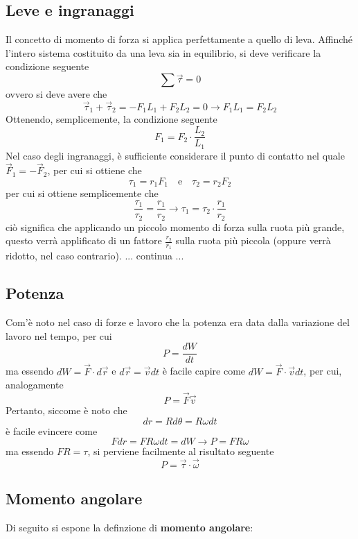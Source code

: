 \documentclass[a4paper]{extarticle}
\begin{document}
\subsection{Leve e ingranaggi}
Il concetto di momento di forza si applica perfettamente a quello di leva. Affinché l'intero sistema costituito da una leva sia in equilibrio, si deve verificare la condizione seguente
\[\sum \vec \tau = 0\]
ovvero si deve avere che
\[\vec \tau_1 + \vec \tau_2 = -F_1 L_1 + F_2 L_2 = 0 \longrightarrow F_1 L_1 = F_2 L_2\]
Ottenendo, semplicemente, la condizione seguente
\[\boxed{F_1=F_2 \cdot \frac{L_2}{L_1}}\]
Nel caso degli ingranaggi, è sufficiente considerare il punto di contatto nel quale $\vec F_1 = - \vec F_2$, per cui si ottiene che
\[\tau_1 = r_1 F_1 \hspace{1em} \text{e} \hspace{1em} \tau_2 = r_2 F_2\]
per cui si ottiene semplicemente che
\[\boxed{\frac{\tau_1}{\tau_2}=\frac{r_1}{r_2} \longrightarrow \tau_1=\tau_2 \cdot \frac{r_1}{r_2}}\]
ciò significa che applicando un piccolo momento di forza sulla ruota più grande, questo verrà applificato di un fattore $\frac{r_2}{r_1}$ sulla ruota più piccola (oppure verrà ridotto, nel caso contrario).
... continua ...

\vspace{1em}
\subsection{Potenza}
Com'è noto nel caso di forze e lavoro che la potenza era data dalla variazione del lavoro nel tempo, per cui
\[\boxed{P=\frac{dW}{dt}}\]
ma essendo $dW=\vec F \cdot d \vec r$ e $d \vec r = \vec v dt$ è facile capire come $dW=\vec F \cdot \vec v dt$, per cui, analogamente
\[\boxed{P=\vec F \vec v}\]
Pertanto, siccome è noto che
\[dr = R d\theta = R \omega dt\]
è facile evincere come
\[F dr = F R \omega dt = dW \longrightarrow P=FR \omega\]
ma essendo $FR=\tau$, si perviene facilmente al risultato seguente
\[\boxed{P=\vec \tau \cdot \vec \omega}\]


\vspace{1em}
\subsection{Momento angolare}
Di seguito si espone la definzione di \textbf{momento angolare}:
\end{document}
